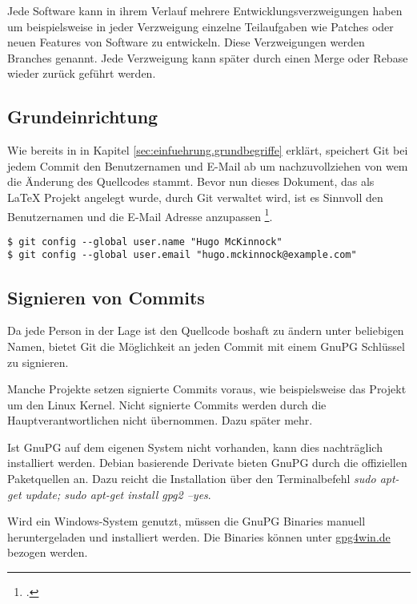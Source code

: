 Jede Software kann in ihrem Verlauf mehrere Entwicklungsverzweigungen haben um beispielsweise in jeder Verzweigung einzelne Teilaufgaben wie Patches oder neuen Features von Software zu entwickeln. Diese Verzweigungen werden Branches genannt. Jede Verzweigung kann später durch einen Merge oder Rebase wieder zurück geführt werden.


\label{sec:einfuehrung.git}
\subsection{Grundeinrichtung}
Wie bereits in in Kapitel \ref{sec:einfuehrung.grundbegriffe} erklärt, speichert Git bei jedem Commit den Benutzernamen und E-Mail ab um nachzuvollziehen von wem die Änderung des Quellcodes stammt. Bevor nun dieses Dokument, das als \LaTeX{} Projekt angelegt wurde, durch Git verwaltet wird, ist es Sinnvoll den Benutzernamen und die E-Mail Adresse anzupassen \footcite{git-1.6-your-identity}.

\begin{verbatim}
$ git config --global user.name "Hugo McKinnock"
$ git config --global user.email "hugo.mckinnock@example.com"
\end{verbatim}


\subsection{Signieren von Commits}
Da jede Person in der Lage ist den Quellcode boshaft zu ändern unter beliebigen Namen, bietet Git die Möglichkeit an jeden Commit mit einem GnuPG Schlüssel zu signieren.

\begin{INFO}
  Manche Projekte setzen signierte Commits voraus, wie beispielsweise das Projekt um den Linux Kernel. Nicht signierte Commits werden durch die Hauptverantwortlichen nicht übernommen. Dazu später mehr.
\end{INFO}

Ist GnuPG auf dem eigenen System nicht vorhanden, kann dies nachträglich installiert werden. Debian basierende Derivate  bieten GnuPG durch die offiziellen Paketquellen an. Dazu reicht die Installation über den Terminalbefehl \textit{sudo apt-get update; sudo apt-get install gpg2 --yes}.

Wird ein Windows-System genutzt, müssen die GnuPG Binaries manuell heruntergeladen und installiert werden. Die Binaries können unter \href{https://www.gpg4win.de}{gpg4win.de} bezogen werden.

